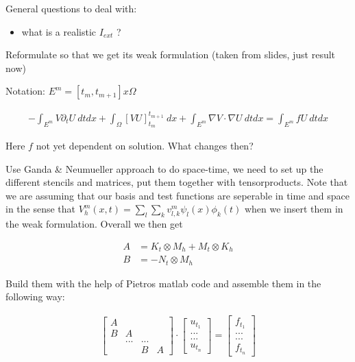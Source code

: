 \documentclass[a4paper, 11pt]{article}
\begin{document}
General questions to deal with:
\begin{itemize}
	\item what is a realistic $I_{ext}$ ?
\end{itemize}

Reformulate so that we get its weak formulation (taken from slides, just result now)

Notation: $E^m = [t_m, t_{m+1}] x \Omega$

\begin{align}
- \int_{E^m} V \partial_t U \ dt dx + \int_{\Omega} [V U ]_{t_m}^{t_{m+1}} \ dx + \int_{E^m} \nabla V \cdot \nabla U \ dt dx = \int_{E^m} f U \ dt dx
\end{align}

Here $f$ not yet dependent on solution. What changes then? 

Use Ganda \& Neumueller approach to do space-time, we need to set up the different stencils and matrices, put them together with tensorproducts. Note that we are assuming that our basis and test functions are seperable in time and space in the sense that $ V_h^m(x,t) = \sum_l \sum_k v_{l,k}^m \psi_l(x) \phi_k(t) $ when we insert them in the weak formulation. Overall we then get

\begin{align*}
A &= K_t \otimes M_h + M_t \otimes K_h \\
B &= - N_t \otimes M_h
\end{align*}

Build them with the help of Pietros matlab code and assemble them in the following way:

\begin{align*}
\begin{bmatrix}
A & & & \\
B & A & & \\
& ... & ... & \\
& & B & A 
\end{bmatrix}  \cdot
\begin{bmatrix}
u_{t_1} \\
 ... \\
 ... \\
 u_{t_n}
\end{bmatrix} = 
\begin{bmatrix}
f_{t_1} \\
... \\
... \\
f_{t_n} 
\end{bmatrix}
\end{align*}
\end{document}
